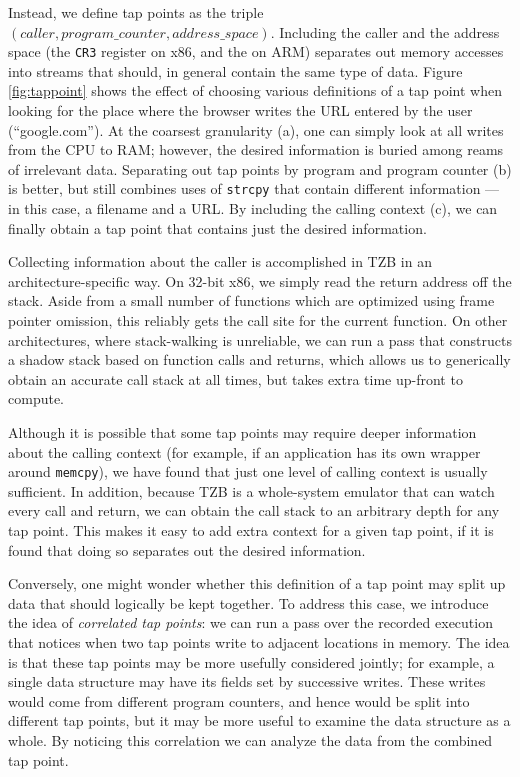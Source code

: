Instead, we define tap points as the triple $(caller, program\_counter,
address\_space)$. Including the caller and the address space (the
\texttt{CR3} register on x86, and the  on ARM) separates
out memory accesses into streams that should, in general contain the
same type of data. Figure \ref{fig:tappoint} shows the effect of
choosing various definitions of a tap point when looking for the place
where the browser writes the URL entered by the user (``google.com'').
At the coarsest granularity (a), one can simply look at all writes from
the CPU to RAM; however, the desired information is buried among reams
of irrelevant data. Separating out tap points by program and program
counter (b) is better, but still combines uses of \texttt{strcpy} that
contain different information --- in this case, a filename and a URL. By
including the calling context (c), we can finally obtain a tap point
that contains just the desired information.

Collecting information about the caller is accomplished in TZB in an
architecture-specific way. On 32-bit x86, we simply read the return
address off the stack. Aside from a small number of functions which are
optimized using frame pointer omission, this reliably gets the call site
for the current function. On other architectures, where stack-walking is
unreliable, we can run a pass that constructs a shadow stack based on
function calls and returns, which allows us to generically obtain an
accurate call stack at all times, but takes extra time up-front to
compute.

Although it is possible that some tap points may require deeper
information about the calling context (for example, if an application
has its own wrapper around \texttt{memcpy}), we have found that just one
level of calling context is usually sufficient. In addition, because TZB
is a whole-system emulator that can watch every call and return, we can
obtain the call stack to an arbitrary depth for any tap point. This
makes it easy to add extra context for a given tap point, if it is found
that doing so separates out the desired information.

 Conversely, one might wonder whether this
definition of a tap point may split up data that should logically be
kept together. To address this case, we introduce the idea of
\emph{correlated tap points}: we can run a pass over the recorded
execution that notices when two tap points write to adjacent locations
in memory. The idea is that these tap points may be more usefully
considered jointly; for example, a single data structure may have its
fields set by successive writes. These writes would come from different
program counters, and hence would be split into different tap points,
but it may be more useful to examine the data structure as a whole. By
noticing this correlation we can analyze the data from the combined tap
point.

